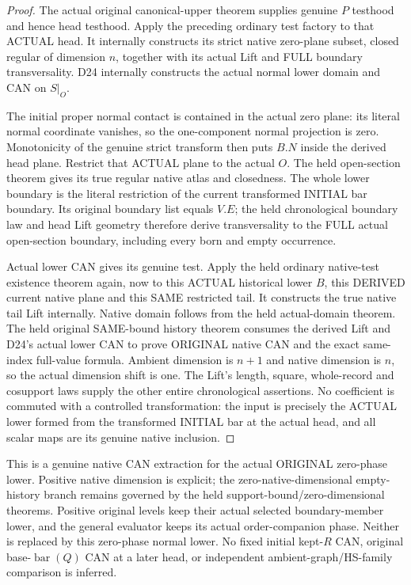 \begin{proof}
The actual original canonical-upper theorem supplies genuine $P$
testhood and hence head testhood. Apply the preceding ordinary test
factory to that ACTUAL head. It internally constructs its strict
native zero-plane subset, closed regular of dimension $n$, together
with its actual Lift and FULL boundary transversality. D24 internally
constructs the actual normal lower domain and CAN on $S|_O$.

The initial proper normal contact is contained in the actual zero
plane: its literal normal coordinate vanishes, so the one-component
normal projection is zero. Monotonicity of the genuine strict
transform then puts $B.N$ inside the derived head plane. Restrict
that ACTUAL plane to the actual $O$. The held open-section theorem
gives its true regular native atlas and closedness. The whole lower
boundary is the literal restriction of the current transformed
INITIAL bar boundary. Its original boundary list equals $V.E$;
the held chronological boundary law and head Lift geometry therefore
derive transversality to the FULL actual open-section boundary,
including every born and empty occurrence.

Actual lower CAN gives its genuine test. Apply the held ordinary
native-test existence theorem again, now to this ACTUAL historical
lower $B$, this DERIVED current native plane and this SAME restricted
tail. It constructs the true native tail Lift internally. Native
domain follows from the held actual-domain theorem. The held
original SAME-bound history theorem consumes the derived Lift and
D24's actual lower CAN to prove ORIGINAL native CAN and the exact
same-index full-value formula. Ambient dimension is $n+1$ and
native dimension is $n$, so the actual dimension shift is one.
The Lift's length, square, whole-record and cosupport laws supply
the other entire chronological assertions. No coefficient is
commuted with a controlled transformation: the input is precisely
the ACTUAL lower formed from the transformed INITIAL bar at the
actual head, and all scalar maps are its genuine native inclusion.
\end{proof}

This is a genuine native CAN extraction for the actual ORIGINAL
zero-phase lower. Positive native dimension is explicit; the
zero-native-dimensional empty-history branch remains governed by
the held support-bound/zero-dimensional theorems. Positive original
levels keep their actual selected boundary-member lower, and the
general evaluator keeps its actual order-companion phase. Neither
is replaced by this zero-phase normal lower. No fixed initial
kept-$R$ CAN, original base-$\operatorname{bar}(Q)$ CAN at a later
head, or independent ambient-graph/HS-family comparison is inferred.

